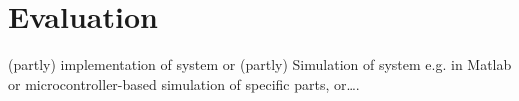 \section{Evaluation}
(partly) implementation of system or (partly) Simulation of system e.g. in Matlab or microcontroller-based simulation of specific parts, or….







